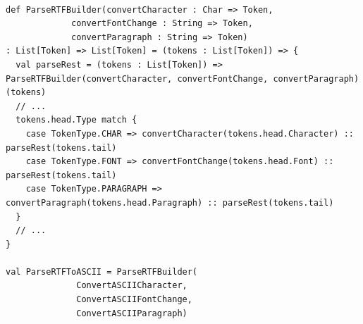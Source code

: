 \begin{lstlisting}[caption={\textit{Builder} Funcional.},label=fpbuilder]
    
def ParseRTFBuilder(convertCharacter : Char => Token,
             convertFontChange : String => Token,
             convertParagraph : String => Token)
: List[Token] => List[Token] = (tokens : List[Token]) => {
  val parseRest = (tokens : List[Token]) => ParseRTFBuilder(convertCharacter, convertFontChange, convertParagraph)(tokens)
  // ...
  tokens.head.Type match {
    case TokenType.CHAR => convertCharacter(tokens.head.Character) :: parseRest(tokens.tail)
    case TokenType.FONT => convertFontChange(tokens.head.Font) :: parseRest(tokens.tail)
    case TokenType.PARAGRAPH => convertParagraph(tokens.head.Paragraph) :: parseRest(tokens.tail)
  }
  // ...
}

val ParseRTFToASCII = ParseRTFBuilder(
              ConvertASCIICharacter,
              ConvertASCIIFontChange,
              ConvertASCIIParagraph)
    
\end{lstlisting}

